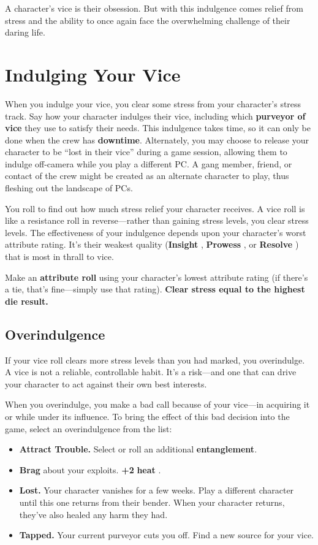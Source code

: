 \documentclass[11pt,fleqn,a5paper]{book}
\newcommand{\gameterm}[1]{\textbf{#1}}
\begin{document}
A character’s vice is their obsession. But with this indulgence comes relief from stress and the ability to once again face the overwhelming challenge of their daring life.

\section{Indulging Your Vice}

When you indulge your vice, you clear some stress from your character’s stress track. Say how your character indulges their vice, including which \textbf{purveyor of vice} they use to satisfy their needs.  This indulgence takes time, so it can only be done when the crew has \textbf{downtime}. Alternately, you may choose to release your character to be “lost in their vice” during a game session, allowing them to indulge off-camera while you play a different PC. A gang member, friend, or contact of the crew might be created as an alternate character to play, thus fleshing out the landscape of PCs.

You roll to find out how much stress relief your character receives. A vice roll is like a resistance roll in reverse---rather than gaining stress levels, you clear stress levels. The effectiveness of your indulgence depends upon your character’s worst attribute rating. It’s their weakest quality (\gameterm{Insight} , \gameterm{Prowess} , or \gameterm{Resolve} ) that is most in thrall to vice.

Make an \textbf{attribute roll} using your character’s lowest attribute rating (if there’s a tie, that’s fine---simply use that rating). \textbf{Clear stress equal to the highest die result.}

\subsection{Overindulgence}

If your vice roll clears more stress levels than you had marked, you overindulge. A vice is not a reliable, controllable habit. It’s a risk---and one that can drive your character to act against their own best interests.

When you overindulge, you make a bad call because of your vice---in acquiring it or while under its influence. To bring the effect of this bad decision into the game, select an overindulgence from the list:

\begin{itemize}
	\item \gameterm{Attract Trouble.}  Select or roll an additional \textbf{entanglement}.
	\item \gameterm{Brag}  about your exploits. \textbf{+2} \gameterm{heat} .
	\item \gameterm{Lost.}  Your character vanishes for a few weeks. Play a different character until this one returns from their bender. When your character returns, they’ve also healed any harm they had.
	\item \gameterm{Tapped.}  Your current purveyor cuts you off. Find a new source for your vice.
\end{itemize}
\end{document}
